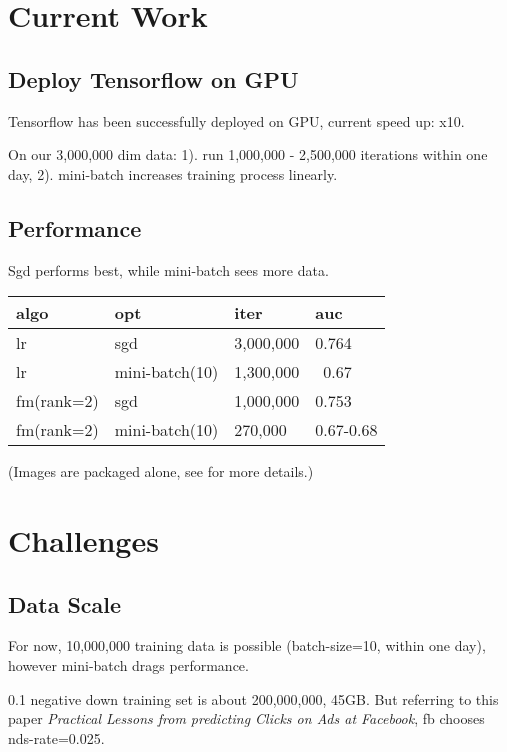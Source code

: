 \documentclass[
  oneside,
  11pt, a4paper,
  footinclude=false,
  headinclude=false,
]{scrbook}
\begin{document}
\chapter{Current Work}

\section{Deploy Tensorflow on GPU}

Tensorflow has been successfully deployed on GPU, current speed up: x10.

On our 3,000,000 dim data: 1). run 1,000,000 - 2,500,000 iterations within one day, 2). mini-batch increases training process linearly.

\section{Performance}

Sgd performs best, while mini-batch sees more data.

\begin{center}
  \begin{tabular}{ | l | l | l | l | }
    \hline
    algo & opt & iter & auc \\ \hline
    lr & sgd & 3,000,000 & 0.764 \\ \hline
    lr & mini-batch(10) & 1,300,000 & ~0.67 \\ \hline
    fm(rank=2) & sgd & 1,000,000 & 0.753 \\ \hline
    fm(rank=2) & mini-batch(10) & 270,000 & 0.67-0.68 \\ \hline
  \end{tabular}
\end{center}

(Images are packaged alone, see for more details.)

\chapter{Challenges}

\section{Data Scale}

For now, 10,000,000 training data is possible (batch-size=10, within one day), however mini-batch drags performance. 

0.1 negative down training set is about 200,000,000, 45GB. But referring to this paper \emph{Practical Lessons from predicting Clicks on Ads at Facebook}, fb chooses nds-rate=0.025.
\end{document}
